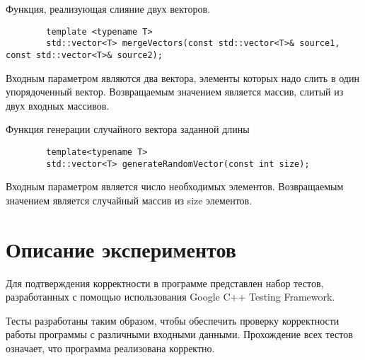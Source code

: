 \documentclass{report}
\begin{document}
	\par Функция, реализующая слияние двух векторов.
	\begin{lstlisting}
		template <typename T>
        std::vector<T> mergeVectors(const std::vector<T>& source1, const std::vector<T>& source2);
	\end{lstlisting}
	\par Входным параметром являются два вектора, элементы которых надо слить в один упорядоченный вектор. Возвращаемым значением является массив, слитый из двух входных массивов.
	\par Функция генерации случайного вектора заданной длины
	\begin{lstlisting}
        template<typename T>
        std::vector<T> generateRandomVector(const int size);
	\end{lstlisting}
	\par Входным параметром является число необходимых элементов. Возвращаемым значением является случайный массив из size элементов.
	\newpage
	
	\section*{Описание экспериментов}
	Для подтверждения корректности в программе представлен набор тестов, разработанных с помощью использования Google C++ Testing Framework.
	\par Тесты разработаны таким образом, чтобы обеспечить проверку корректности работы программы с различными входными данными. Прохождение всех тестов означает, что программа реализована корректно.
	\newpage
	
\end{document}
